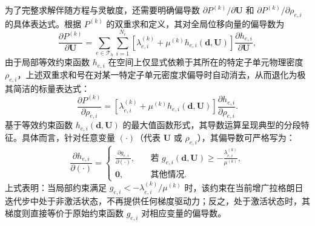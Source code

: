为了完整求解伴随方程与灵敏度，还需要明确偏导数 $\partial P^{(k)}/\partial \boldsymbol{U}$ 和 $\partial P^{(k)}/\partial\rho_{e,i}$ 的具体表达式。根据 $P^{(k)}$ 的双重求和定义，其对全局位移向量的偏导数为
\[
\frac{\partial P^{(k)}}{\partial \boldsymbol{U}} = \sum_{e \in \mathcal{T}_h} \sum_{i=1}^{N_e} \left[ \lambda_{e,i}^{(k)} + \mu^{(k)} h_{e,i}(\boldsymbol{d}, \boldsymbol{U}) \right] \frac{\partial h_{e,i}}{\partial \boldsymbol{U}},
\]
由于局部等效约束函数 $h_{e,i}$ 在空间上仅显式依赖于其所在的特定子单元物理密度 $\rho_{e,i}$，上述双重求和号在对某一特定子单元密度求偏导时自动消去，从而退化为极其简洁的标量表达式：
\[
\frac{\partial P^{(k)}}{\partial\rho_{e,i}} = \left[ \lambda_{e,i}^{(k)} + \mu^{(k)} h_{e,i}(\boldsymbol{d}, \boldsymbol{U}) \right] \frac{\partial h_{e,i}}{\partial\rho_{e,i}}.
\]
基于等效约束函数 $h_{e,i}(\boldsymbol{d}, \boldsymbol{U})$ 的最大值函数形式，其导数运算呈现典型的分段特征。具体而言，针对任意变量 $(\cdot)$（代表 $\boldsymbol{U}$ 或 $\rho_{e,i}$），其偏导数可严格写为：
\begin{equation} \label{eq:ch4_h_derivative}
	\frac{\partial h_{e,i}}{\partial(\cdot)} = 
	\begin{cases}
		\displaystyle \frac{\partial g_{e,i}}{\partial(\cdot)}, &\quad \text{若 } g_{e,i}(\boldsymbol{d}, \boldsymbol{U}) \ge -\frac{\lambda_{e,i}^{(k)}}{\mu^{(k)}}, \\
		\boldsymbol{0}, &\quad \text{其他情况}.
	\end{cases}
\end{equation}
上式表明：当局部约束满足 $g_{e,i} < -\lambda_{e,i}^{(k)}/\mu^{(k)}$ 时，该约束在当前增广拉格朗日迭代步中处于非激活状态，不再提供任何梯度驱动力；反之，处于激活状态时，其梯度则直接等价于原始约束函数 $g_{e,i}$ 对相应变量的偏导数。


